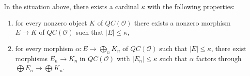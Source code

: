 \begin{lemma}
\label{lemma-cartesian-colimit-kappa}
In the situation above, there exists a cardinal $\kappa$ with the following
properties:
\begin{enumerate}
\item for every nonzero object $K$ of $\mathit{QC}(\mathcal{O})$ there exists a
nonzero morphism $E \to K$ of $\mathit{QC}(\mathcal{O})$ such that
$|E| \leq \kappa$,
\item for every morphism $\alpha : E \to \bigoplus_n K_n$ of
$\mathit{QC}(\mathcal{O})$ such that $|E| \leq \kappa$, there
exist morphisms $E_n \to K_n$
in $\mathit{QC}(\mathcal{O})$ with $|E_n| \leq \kappa$
such that $\alpha$ factors through $\bigoplus E_n \to \bigoplus K_n$.
\end{enumerate}
\end{lemma}

